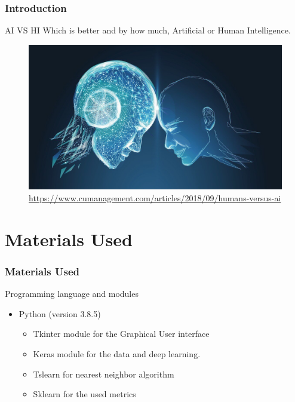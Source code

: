 \documentclass{beamer}
\begin{document}
\begin{frame}
\frametitle{Introduction}
\begin{block}{AI VS HI}
Which is better and by how much, Artificial or Human Intelligence.
\end{block}
\begin{figure}
\includegraphics[scale=0.2]{AI_VS_HI.jpg}
\caption{\url{https://www.cumanagement.com/articles/2018/09/humans-versus-ai}}
\end{figure}
\end{frame}

\section{Materials Used}

\begin{frame}
\frametitle{Materials Used}
\begin{block}{Programming language and modules}
\begin{itemize}
\item Python (version 3.8.5)
\begin{itemize}
\item Tkinter module for the Graphical User interface
\item Keras module for the data and deep learning.
\item Tslearn for nearest neighbor algorithm
\item Sklearn for the used metrics
\end{itemize}
\end{itemize}
\end{block}

\end{frame}
\end{document}
